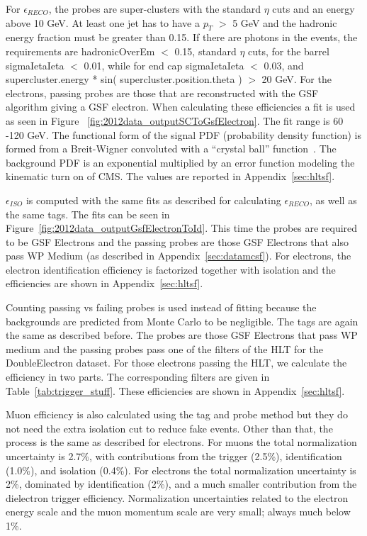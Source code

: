 For $\epsilon_{RECO}$, the probes are super-clusters with the standard $\eta$ cuts and an energy above 10 GeV. At least one jet has to have a $p_T$ $>$ 5 GeV and the hadronic energy fraction must be greater than 0.15. If there are photons in the events, the requirements are hadronicOverEm $<$ 0.15, standard $\eta$ cuts, for the barrel sigmaIetaIeta $<$ 0.01, while for end cap sigmaIetaIeta $<$ 0.03, and supercluster.energy * sin( supercluster.position.theta ) $>$ 20 GeV. For the electrons, passing probes are those that are reconstructed with the GSF algorithm giving a GSF electron.  When calculating these efficiencies a fit is used as seen in Figure ~\ref{fig:2012data_outputSCToGsfElectron}.  The fit range is 60 -120 GeV. The functional form of the signal PDF (probability density function) is formed from a Breit-Wigner convoluted with a ``crystal ball'' function~\cite{CrystalBall}. The background PDF is an exponential multiplied by an error function modeling the kinematic turn on of CMS. The values are reported in Appendix~\ref{sec:hltsf}.


$\epsilon_{ISO}$ is computed with the same fits as described for calculating $\epsilon_{RECO}$, as well as the same tags. The fits can be seen in Figure~\ref{fig:2012data_outputGsfElectronToId}. This time the probes are required to be GSF Electrons and the passing probes are those GSF Electrons that also pass WP Medium (as described in Appendix~\ref{sec:datamcsf}). For electrons, the electron identification efficiency is factorized together with isolation and the efficiencies are shown in Appendix~\ref{sec:hltsf}.


Counting passing vs failing probes is used instead of fitting because the backgrounds are predicted from Monte Carlo to be negligible. The tags are again the same as described before. The probes are those GSF Electrons that pass WP medium and the passing probes pass one of the filters of the HLT for the DoubleElectron dataset. For those electrons passing the HLT, we calculate the efficiency in two parts.  The corresponding filters are given in Table~\ref{tab:trigger_stuff}. These efficiencies are shown in Appendix~\ref{sec:hltsf}.

Muon efficiency is also calculated using the tag and probe method but they do not need the extra isolation cut to reduce fake events.  Other than that, the process is the same as described for electrons.  For muons the total normalization uncertainty is 2.7\%, with contributions from the trigger (2.5\%), identification (1.0\%), and isolation (0.4\%). For electrons the total normalization uncertainty is 2\%, dominated by identification (2\%), and a much smaller contribution from the dielectron trigger efficiency. Normalization uncertainties related to the electron energy scale and the muon momentum scale are very small; always much below 1\%.


